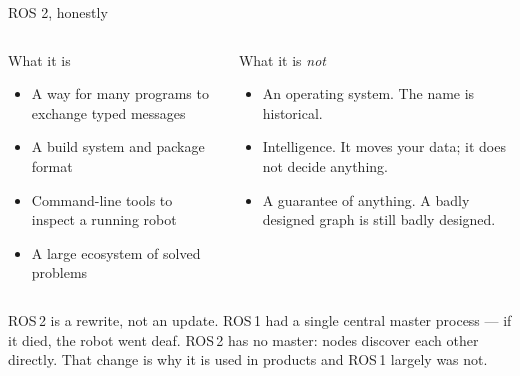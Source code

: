 \documentclass[aspectratio=169]{beamer}
\begin{document}
\begin{frame}{ROS 2, honestly}
  \begin{columns}[T,onlytextwidth]
    \begin{block}{\small What it is}
      \footnotesize
      \begin{itemize}
        \item A way for many programs to exchange typed messages
        \item A build system and package format
        \item Command-line tools to inspect a running robot
        \item A large ecosystem of solved problems
      \end{itemize}
    \end{block}

    \begin{block}{\small What it is \emph{not}}
      \footnotesize
      \begin{itemize}
        \item An operating system. The name is historical.
        \item Intelligence. It moves your data; it does not decide anything.
        \item A guarantee of anything. A badly designed graph is still badly designed.
      \end{itemize}
    \end{block}
  \end{columns}

  \vspace{0.8em}
  \begin{underhood}
    \footnotesize
    ROS\,2 is a rewrite, not an update. ROS\,1 had a single central master process --- if it
    died, the robot went deaf. ROS\,2 has no master: nodes discover each other directly.
    That change is why it is used in products and ROS\,1 largely was not.
  \end{underhood}
\end{frame}
\end{document}

